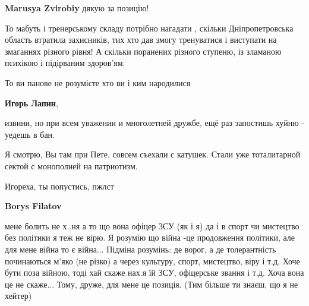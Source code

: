 \begin{itemize}
\begin{itemize}
 
\textbf{Marusya Zvirobiy} дякую за позицію!

\end{itemize}

 

То мабуть і тренерському складу потрібно нагадати , скільки Дніпропетровська
область втратила захисників, тих хто дав змогу тренуватися і виступати на
змаганнях різного рівня! А скільки поранених різного ступеню, із зламаною
психікою і підірваним здоров'ям.

То ви панове не розумієте хто ви і ким народилися

\begin{itemize}
 
\textbf{Игорь Лапин}, 

извини, но при всем уважении и многолетней дружбе, ещё раз запостишь хуйню -
уедешь в бан.

Я смотрю, Вы там при Пете, совсем съехали с катушек. Стали уже тоталитарной
сектой с монополией на патриотизм.

Игореха, ты попустись, пжлст

 

\textbf{Borys Filatov} 

мене болить не х..ня а то що вона офіцер ЗСУ (як і я) да
і в спорт чи мистецтво без політики я теж не вірю. Я розумію що війна -це
продовження політики, але для мене війна то є війна... Підміна розумінь: де
ворог, а де толерантність починаються м'яко (не різко) а через культуру, спорт,
мистецтво, віру і т.д. Хоче бути поза війною, тоді хай скаже нах.я їй ЗСУ,
офіцерське звання і т.д.  Хоча вона це не скаже... Тому, друже, для мене це
позиція. (Тим більше ти знаєш, що я не хейтер)



\end{itemize}
\end{itemize}
